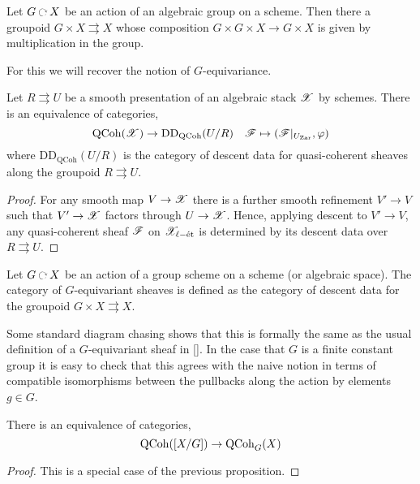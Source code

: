 \documentclass[12pt]{article}
\begin{document}
\begin{example}
Let $G \acts X$ be an action of an algebraic group on a scheme. Then there a groupoid $G \times X \rightrightarrows X$ whose composition $G \times G \times X \to G \times X$ is given by multiplication in the group. 

For this we will recover the notion of $G$-equivariance. 
\end{example}


\begin{prop}
Let $R \rightrightarrows U$ be a smooth presentation of an algebraic stack $\mathscr{X}$ by schemes. There is an equivalence of categories,
\[ \mathrm{QCoh}(\mathscr{X}) \to \mathrm{DD}_{\mathrm{QCoh}}(U/R) \quad \mathscr{F} \mapsto (\mathscr{F}|_{U_{\mathrm{Zar}}}, \varphi) \]
where $\mathrm{DD}_{\mathrm{QCoh}}(U/R)$ is the category of descent data for quasi-coherent sheaves along the groupoid $R \rightrightarrows U$.
\end{prop}

\begin{proof}
For any smooth map $V \to \mathscr{X}$ there is a further smooth refinement $V' \to V$ such that $V' \to \mathscr{X}$ factors through $U \to \mathscr{X}$. Hence, applying descent to $V' \to V$, any quasi-coherent sheaf $\mathscr{F}$ on $\mathscr{X}_{\ell-\text{\'{e}t}}$ is determined by its descent data over $R \rightrightarrows U$.
\end{proof}

\begin{defn}
Let $G \acts X$ be an action of a group scheme on a scheme (or algebraic space). The category of $G$-equivariant sheaves is defined as the category of descent data for the groupoid $G \times X \rightrightarrows X$.
\end{defn}

\begin{rmk}
Some standard diagram chasing shows that this is formally the same as the usual definition of a $G$-equivariant sheaf in []. In the case that $G$ is a finite constant group it is easy to check that this agrees with the naive notion in terms of compatible isomorphisms between the pullbacks along the action by elements $g \in G$. 
\end{rmk}

\begin{prop}
There is an equivalence of categories,
\[ \mathrm{QCoh}([X/G]) \to \mathrm{QCoh}_{G}(X) \]
\end{prop}

\begin{proof}
This is a special case of the previous proposition.
\end{proof}
\end{document}
